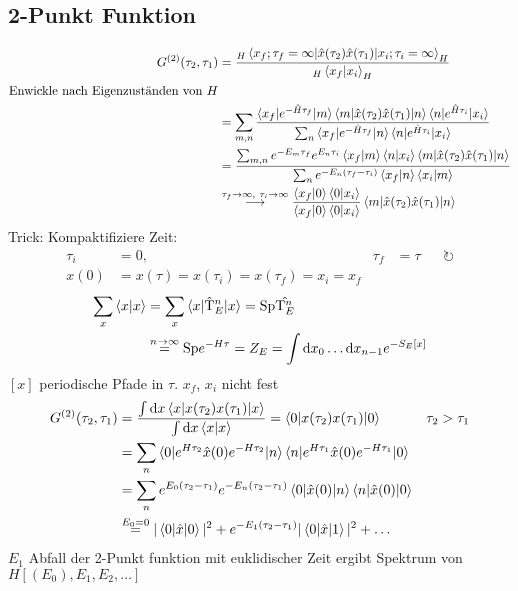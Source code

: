 \subsection{2-Punkt Funktion}
	\begin{align*}
		G^{(2)} (\tau_2, \tau_1) &=
		\frac{{}_H\braket{x_f; \tau_f = \infty | \hat{x} (\tau_2) \hat{x}(\tau_1) | x_i; \tau_i = \infty}_H}{{}_H\braket{x_f | x_i}_H} \\
		\text{Enwickle nach Eigenzuständen von }H& \\
		&= \sum_{m, n} \frac{\braket{x_f | e^{-\hat{H} \tau_f} | m} 
		\braket{m | \hat{x} (\tau_2) \hat{x} (\tau_1)| n} \braket{n | e^{\hat{H} \tau_i} | x_i}}{\sum_n \braket{x_f | e^{-\hat{H}\tau_f} | n} \braket{n | e^{\hat{H} \tau_i} | x_i}} \\
		&= \frac{\sum_{m,n} e^{-E_m\tau_f}e^{E_n\tau_i} \braket{x_f | m} \braket{n|x_i} \braket{m | \hat{x} (\tau_2) \hat{x} (\tau_1) | n}}{\sum_n e^{-E_n(\tau_f -\tau_i)} \braket{x_f | n} \braket{x_i | m}}\\
		&\overset{\tau_f \rightarrow \infty,~\tau_i \rightarrow \infty}{\longrightarrow}
		\frac{\braket{x_f | 0} \braket{0 | x_i}}{\braket{x_f | 0} \braket{0 | x_i}} \braket{m | \hat{x} (\tau_2) \hat{x} (\tau_1) | n}
	\end{align*}
Trick: Kompaktifiziere Zeit:
	\begin{align*}
		\tau_i &= 0,& \tau_f&= \tau & &\circlearrowright \\
		x(0) &= x(\tau) = x(\tau_i) = x(\tau_f) = x_i = x_f
	\end{align*}
	\begin{align*}
		\sum_x \braket{x | x} &= 
		\sum_x \braket{x | \hat{\mathrm{T}}_E^n | x} = \mathrm{Sp} \hat{\mathrm{T}_E^n} \\
		&\overset{n \rightarrow \infty}{=} \mathrm{Sp} e^{-H\tau} = Z_E = 
		\int \mathrm{d} x_0 \ldots \mathrm{d} x_{n-1} e^{-S_E[x]}
	\end{align*}
$[x]$ periodische Pfade in $\tau$.  $x_f$, $x_i$ nicht fest
	\begin{align*}
		G^{(2)}(\tau_2, \tau_1) &=
		\frac{\int \mathrm{d} x \braket{x | x(\tau_2) x(\tau_1) | x}}{\int \mathrm{d} x\braket{x | x}} 
		= \braket{0 | x(\tau_2) x(\tau_1) | 0} 
		& \tau_2 &> \tau_1 \\
		&= \sum_n \braket{0 | e^{H \tau_2} \hat{x} (0) e^{-H \tau_2} | n}
		\braket{n | e^{H \tau_1} \hat{x} (0) e^{-H \tau_1} | 0} \\
		&= \sum_n e^{E_0(\tau_2 - \tau_1)} e^{-E_n(\tau_2 - \tau_1)}
		\braket{0 | \hat{x} (0) | n} \braket{n | \hat{x} (0) | 0} \\
		&\overset{E_0 = 0}{=} |\braket{0 | \hat{x} | 0 }|^2 + e^{-E_1(\tau_2 - \tau_1)} 
		|\braket{0 | \hat{x} | 1}|^2 + \ldots
	\end{align*}
$E_1$ Abfall der 2-Punkt funktion mit euklidischer Zeit ergibt Spektrum von $H [(E_0), E_1 ,E_2, \ldots]$

